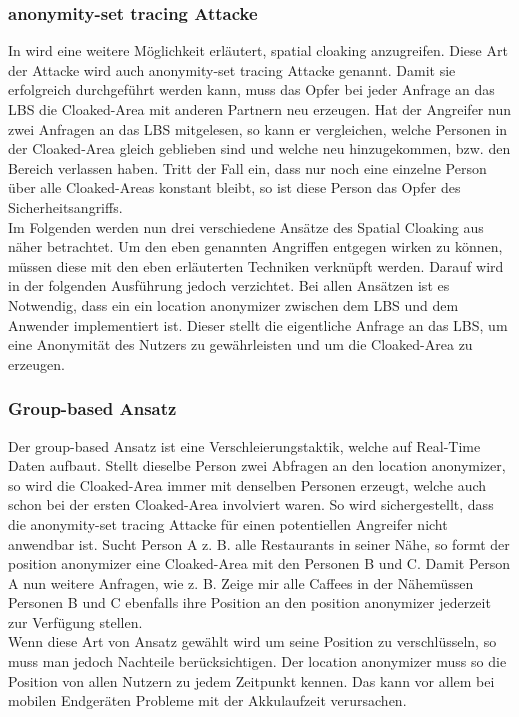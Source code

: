 \subsubsection{anonymity-set tracing Attacke} 
In \cite{chow2007} wird eine weitere Möglichkeit erläutert, spatial cloaking anzugreifen. Diese Art der Attacke wird auch anonymity-set tracing Attacke genannt. Damit sie erfolgreich durchgeführt werden kann, muss das Opfer bei jeder Anfrage an das LBS die Cloaked-Area mit anderen Partnern neu erzeugen. Hat der Angreifer nun zwei Anfragen an das LBS mitgelesen, so kann er vergleichen, welche Personen in der Cloaked-Area gleich geblieben sind und welche neu hinzugekommen, bzw. den Bereich verlassen haben. Tritt der Fall ein, dass nur noch eine einzelne Person über alle Cloaked-Areas konstant bleibt, so ist diese Person das Opfer des Sicherheitsangriffs.\\ 



Im Folgenden werden nun drei verschiedene Ansätze des Spatial Cloaking aus \cite{Chow2011} näher betrachtet. Um den eben genannten Angriffen entgegen wirken zu können, müssen diese mit den eben erläuterten Techniken verknüpft werden. Darauf wird in der folgenden Ausführung jedoch verzichtet. Bei allen Ansätzen ist es Notwendig, dass ein ein location anonymizer zwischen dem LBS und dem Anwender implementiert ist. Dieser stellt die eigentliche Anfrage an das LBS, um eine Anonymität des Nutzers zu gewährleisten und um die Cloaked-Area zu erzeugen. 
\subsubsection{Group-based Ansatz} 
Der group-based Ansatz ist eine Verschleierungstaktik, welche auf Real-Time Daten aufbaut. Stellt dieselbe Person zwei Abfragen an den location anonymizer, so wird die Cloaked-Area immer mit denselben Personen erzeugt, welche auch schon bei der ersten Cloaked-Area involviert waren. So wird sichergestellt, dass die anonymity-set tracing Attacke für einen potentiellen Angreifer nicht anwendbar ist. Sucht Person A z. B. alle Restaurants in seiner Nähe, so formt der position anonymizer eine Cloaked-Area mit den Personen B und C. Damit Person A nun weitere Anfragen, wie z. B. \glqq Zeige mir alle Caffees in der Nähe\grqq müssen Personen B und C ebenfalls ihre Position an den position anonymizer jederzeit zur Verfügung stellen. \\Wenn diese Art von Ansatz gewählt wird um seine Position zu verschlüsseln, so muss man jedoch Nachteile berücksichtigen. Der location anonymizer muss so die Position von allen Nutzern zu jedem Zeitpunkt kennen. Das kann vor allem bei mobilen Endgeräten Probleme mit der Akkulaufzeit verursachen.  
